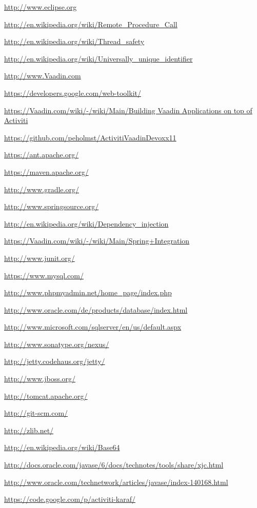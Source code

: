 \documentclass[paper=a4,twoside=false,BCOR=0mm,DIV=calc,fontsize=12pt]{scrartcl}
\begin{document}
\begin{thebibliography}{99}
 \url{http://www.eclipse.org} %

 \url{http://en.wikipedia.org/wiki/Remote_Procedure_Call}

 \url{http://en.wikipedia.org/wiki/Thread_safety}

 \url{http://en.wikipedia.org/wiki/Universally_unique_identifier}

 \url{http://www.Vaadin.com}

 \url{https://developers.google.com/web-toolkit/}

 \url{https://Vaadin.com/wiki/-/wiki/Main/Building Vaadin Applications on top of Activiti}

 \url{https://github.com/peholmst/ActivitiVaadinDevoxx11}

 \url{https://ant.apache.org/}

 \url{https://maven.apache.org/}

 \url{http://www.gradle.org/}

 \url{http://www.springsource.org/}

 \url{http://en.wikipedia.org/wiki/Dependency_injection}

 \url{https://Vaadin.com/wiki/-/wiki/Main/Spring+Integration}

 \url{http://www.junit.org/}

 \url{https://www.mysql.com/}

 \url{http://www.phpmyadmin.net/home_page/index.php}

 \url{http://www.oracle.com/de/products/database/index.html}

 \url{http://www.microsoft.com/sqlserver/en/us/default.aspx}

 \url{http://www.sonatype.org/nexus/}

 \url{http://jetty.codehaus.org/jetty/}

 \url{http://www.jboss.org/}

 \url{http://tomcat.apache.org/}

 \url{http://git-scm.com/}

 \url{http://zlib.net/}

 \url{http://en.wikipedia.org/wiki/Base64}

 \url{http://docs.oracle.com/javase/6/docs/technotes/tools/share/xjc.html}

 \url{http://www.oracle.com/technetwork/articles/javase/index-140168.html}

 \url{https://code.google.com/p/activiti-karaf/}

\end{thebibliography}
\end{document}
